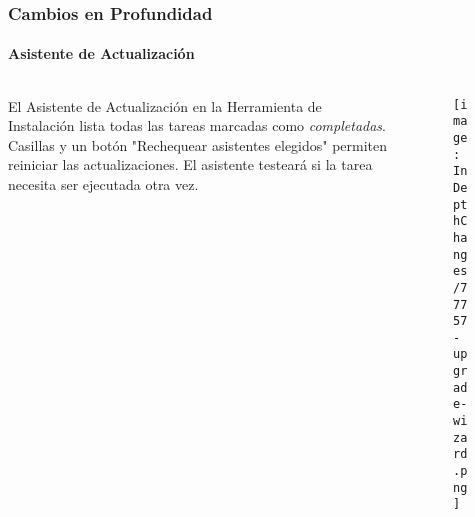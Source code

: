 \begin{frame}[fragile]
	\frametitle{Cambios en Profundidad}
	\framesubtitle{Asistente de Actualización}

	\begin{columns}[T]
		\begin{column}{.5\textwidth}
			El Asistente de Actualización en la Herramienta de Instalación lista todas las tareas marcadas como \textit{completadas}.
			\newline\newline
			Casillas y un botón "Rechequear asistentes elegidos" permiten reiniciar las actualizaciones.
			El asistente testeará si la tarea necesita ser ejecutada otra vez.
		\end{column}
		\begin{column}{.5\textwidth}
			\begin{figure}\vspace*{-0.5cm}
				\texttt{[image: InDepthChanges/77757-upgrade-wizard.png]}
			\end{figure}
		\end{column}
	\end{columns}

\end{frame}









